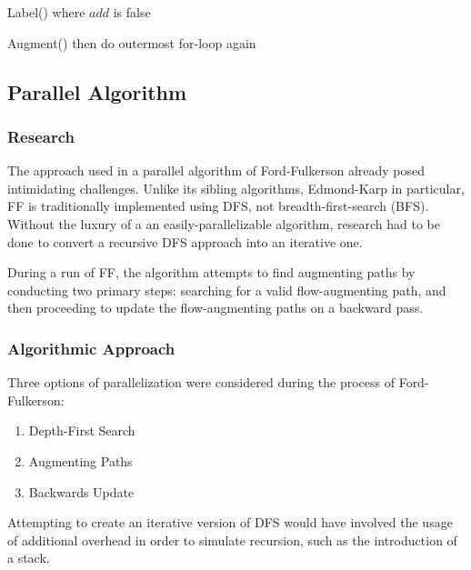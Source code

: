 \begin{algorithm}
\begin{algorithmic}[1]
                                        Label() where $add$ is false
                                    \EndIf
                            \EndIf
                        \EndFor
                        
                            Augment()
                            then do outermost for-loop again
                        \EndIf
                    \EndFor
                \EndFor\\
            \end{algorithmic}
        \end{algorithm}

\subsection{Parallel Algorithm}
    \subsubsection{Research}
        The approach used in a parallel algorithm of Ford-Fulkerson already posed intimidating challenges. Unlike its sibling algorithms, Edmond-Karp in particular, FF is traditionally implemented using DFS, not breadth-first-search (BFS). Without the luxury of a an easily-parallelizable algorithm, research had to be done to convert a recursive DFS approach into an iterative one.
        
        During a run of FF, the algorithm attempts to find augmenting paths by conducting two primary steps: searching for a valid flow-augmenting path, and then proceeding to update the flow-augmenting paths on a backward pass.
        
        
    \subsubsection{Algorithmic Approach}
        Three options of parallelization were considered during the process of Ford-Fulkerson:
        \begin{enumerate}
            \item Depth-First Search
            \item Augmenting Paths
            \item Backwards Update
        \end{enumerate}
        Attempting to create an iterative version of DFS would have involved the usage of additional overhead in order to simulate recursion, such as the introduction of a stack.
        
